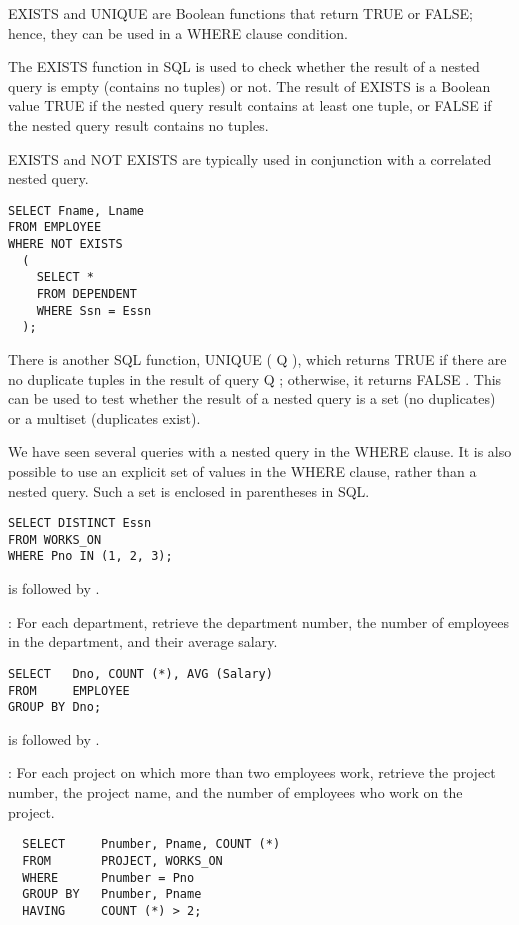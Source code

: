     \par EXISTS and UNIQUE are Boolean functions that return TRUE or FALSE; hence, they can be used in a WHERE clause condition.
    \par The EXISTS function in SQL is used to check whether the result of a nested query is empty (contains no tuples) or not. The result of EXISTS is a Boolean value TRUE if the nested query result contains at least one tuple, or FALSE if the nested query result contains no tuples.
    \par EXISTS and NOT EXISTS are typically used in conjunction with a correlated nested
query.
      \begin{verbatim}
SELECT Fname, Lname
FROM EMPLOYEE
WHERE NOT EXISTS
  (
    SELECT *
    FROM DEPENDENT
    WHERE Ssn = Essn
  );
      \end{verbatim}
\par There is another SQL function, UNIQUE ( Q ), which returns TRUE if there are no
duplicate tuples in the result of query Q ; otherwise, it returns FALSE . This can be
used to test whether the result of a nested query is a set (no duplicates) or a multiset
(duplicates exist).

  \par We have seen several queries with a nested query in the WHERE clause. It is also possible to use an explicit set of values in the WHERE clause, rather than a nested query. Such a set is enclosed in parentheses in SQL.

  \begin{verbatim}
SELECT DISTINCT Essn
FROM WORKS_ON
WHERE Pno IN (1, 2, 3);
  \end{verbatim}

    \par {} is followed by .
    \par {}: For each department, retrieve the department number, the number of employees in the department, and their average salary.
    \begin{verbatim}
SELECT   Dno, COUNT (*), AVG (Salary)
FROM     EMPLOYEE
GROUP BY Dno;
    \end{verbatim}

    \par {} is followed by .
    \par {}: For each project on which more than two employees work, retrieve the project number, the project name, and the number of employees who work on the project.
      \begin{verbatim}
  SELECT     Pnumber, Pname, COUNT (*)
  FROM       PROJECT, WORKS_ON
  WHERE      Pnumber = Pno
  GROUP BY   Pnumber, Pname
  HAVING     COUNT (*) > 2;
      \end{verbatim}


